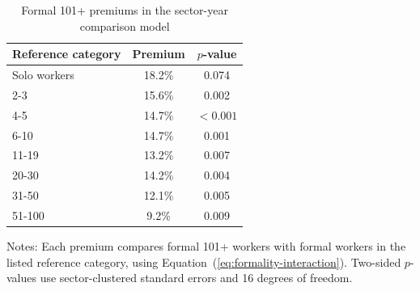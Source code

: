 \begin{table}[htbp]
  \centering
  \caption{Formal 101+ premiums in the sector-year comparison model}
  \label{tab:formal-101-contrasts}
  \small
  \begin{tabular}{lcc}
    \toprule
    Reference category & Premium & $p$-value \\
    \midrule
    Solo workers & 18.2\% & 0.074 \\
    2-3 & 15.6\% & 0.002 \\
    4-5 & 14.7\% & $<0.001$ \\
    6-10 & 14.7\% & 0.001 \\
    11-19 & 13.2\% & 0.007 \\
    20-30 & 14.2\% & 0.004 \\
    31-50 & 12.1\% & 0.005 \\
    51-100 & 9.2\% & 0.009 \\
    \bottomrule
  \end{tabular}
  \vspace{0.3em}
  \begin{minipage}{0.92\textwidth}
  \footnotesize
  Notes: Each premium compares formal 101+ workers with formal workers in the listed reference category, using Equation~(\ref{eq:formality-interaction}). Two-sided $p$-values use sector-clustered standard errors and 16 degrees of freedom.
  \end{minipage}
\end{table}
